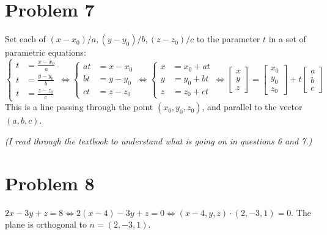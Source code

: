 \documentclass[preview, margin=0.6in]{standalone}
\newcommand*{\problem}[1]{\section*{Problem #1}}
\begin{document}
\problem{7}

Set each of $(x-x_0)/a,(y-y_0)/b,(z-z_0)/c$ to the parameter $t$ in a set of parametric equations:
\begin{equation*}
	\left\{ 
		\begin{aligned}
			t&=\frac{x-x_0}{a} \\
			t&=\frac{y-y_0}{b} \\
			t&=\frac{z-z_0}{c}
		\end{aligned}
	\right.
	\iff 
	\left\{ 
		\begin{aligned}
			at&=x-x_0 \\
			bt&=y-y_0 \\
			ct&=z-z_0
		\end{aligned}
	\right.
	\iff 
	\left\{ 
		\begin{aligned}
			x&=x_0+at \\
			y&=y_0+bt \\
			z&=z_0+ct
		\end{aligned}
	\right.
	\iff 
	\begin{bmatrix}
		x \\ y \\ z
	\end{bmatrix}
	=\begin{bmatrix}
		x_0 \\ y_0 \\ z_0
	\end{bmatrix}
	+ t\begin{bmatrix}
		a \\ b \\ c
	\end{bmatrix}
\end{equation*}
This is a line passing through the point $(x_0,y_0,z_0)$, and parallel to the vector $(a,b,c)$.

\textit{(I read through the textbook to understand what is going on in questions 6 and 7.)}

\problem{8}

$2x-3y+z=8\iff 2(x-4)-3y+z=0\iff (x-4,y,z)\cdot(2,-3,1)=0$. The plane is orthogonal to $n=(2,-3,1)$.
\end{document}
